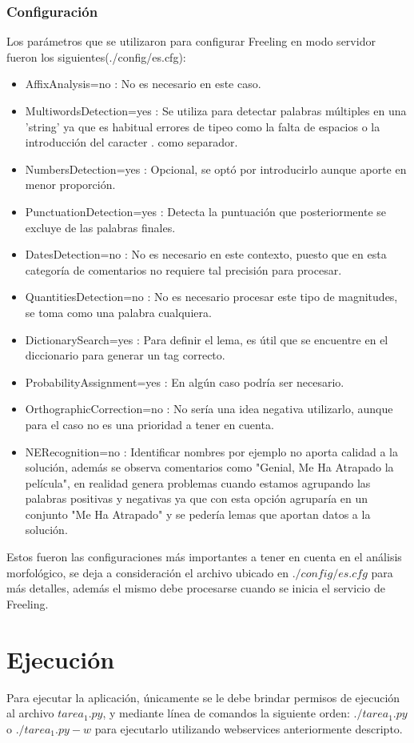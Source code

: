 \documentclass[12pt]{article}
\begin{document}
\subsubsection{Configuración}\label{configFree}
Los parámetros que se utilizaron para configurar Freeling en modo servidor fueron los siguientes(./config/es.cfg):
\begin{itemize}
\item AffixAnalysis=no : No es necesario en este caso.
\item MultiwordsDetection=yes : Se utiliza para detectar palabras múltiples en una 'string' ya que es habitual errores de tipeo como la falta de espacios o la introducción del caracter $.$ como separador.
\item NumbersDetection=yes : Opcional, se optó por introducirlo aunque aporte en menor proporción.
\item PunctuationDetection=yes : Detecta la puntuación que posteriormente se excluye de las palabras finales.
\item DatesDetection=no : No es necesario en este contexto, puesto que en esta categoría de comentarios no requiere tal precisión para procesar.
\item QuantitiesDetection=no : No es necesario procesar este tipo de magnitudes, se toma como una palabra cualquiera. 
\item DictionarySearch=yes : Para definir el lema, es útil que se encuentre en el diccionario para generar un tag correcto.
\item ProbabilityAssignment=yes : En algún caso podría ser necesario.
\item OrthographicCorrection=no : No sería una idea negativa utilizarlo, aunque para el caso no es una prioridad a tener en cuenta.
\item NERecognition=no : Identificar nombres por ejemplo no aporta calidad a la solución, además se observa comentarios como "Genial, Me Ha Atrapado la película", en realidad genera problemas cuando estamos agrupando las palabras positivas y negativas ya que con esta opción agruparía en un conjunto "Me Ha Atrapado" y se pedería lemas que aportan datos a la solución.
\end{itemize}
Estos fueron las configuraciones más importantes a tener en cuenta en el análisis morfológico, se deja a consideración el archivo ubicado en $./config/es.cfg$ para más detalles, además el mismo debe procesarse cuando se inicia el servicio de Freeling.


\section{Ejecución}
Para ejecutar la aplicación, únicamente se le debe brindar permisos de ejecución al archivo $tarea_1.py$, y mediante línea de comandos la siguiente orden:
$./tarea_1.py$
o $./tarea_1.py -w$ para ejecutarlo utilizando webservices anteriormente descripto.
\end{document}
